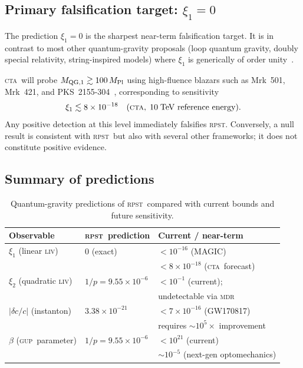 \documentclass[aps,prd,twocolumn,showpacs,preprintnumbers]{revtex4-2}
\newcommand{\rpst}{\textsc{rpst}}
\newcommand{\Mpl}{M_{\rm Pl}}
\newcommand{\CTA}{\textsc{cta}}
\newcommand{\MDR}{\textsc{mdr}}
\newcommand{\GUP}{\textsc{gup}}
\newcommand{\LIV}{\textsc{liv}}
\newcommand{\abs}[1]{\left|#1\right|}
\begin{document}
\subsection{Primary falsification target: \texorpdfstring{$\xi_1 = 0$}{xi1=0}}

The prediction $\xi_1 = 0$ is the sharpest near-term falsification target.
It is in contrast to most other quantum-gravity proposals (loop quantum
gravity, doubly special relativity, string-inspired models) where $\xi_1$ is
generically of order unity~\cite{Amelino-Camelia2000,Gambini1998}.

\CTA\ will probe $M_{\rm QG,1} \gtrsim 100\,\Mpl$ using high-fluence blazars
such as Mrk~501, Mrk~421, and PKS~2155-304~\cite{CTA2019}, corresponding to
sensitivity
\begin{equation}
  \xi_1 \lesssim 8 \times 10^{-18}
  \quad (\CTA,\;10\;\text{TeV reference energy}).
\end{equation}
Any positive detection at this level immediately falsifies \rpst.  Conversely,
a null result is consistent with \rpst\ but also with several other
frameworks; it does not constitute positive evidence.

\subsection{Summary of predictions}

\begin{table}[h]
\caption{Quantum-gravity predictions of \rpst\ compared with current bounds
and future sensitivity.}
\label{tab:predictions}
\begin{ruledtabular}
\begin{tabular}{lll}
Observable & \rpst\ prediction & Current / near-term\\
\hline
$\xi_1$ (linear \LIV)      & $0$ (exact)                 & $< 10^{-16}$ (MAGIC)~\cite{MAGIC2020}\\
                            &                             & $< 8\times10^{-18}$ (\CTA\ forecast)\\[2pt]
$\xi_2$ (quadratic \LIV)   & $1/p = 9.55\times10^{-6}$  & $< 10^{-1}$ (current); \\
                            &                             & \quad undetectable via \MDR\\[2pt]
$\abs{\delta c/c}$ (instanton) & $3.38\times10^{-21}$    & $< 7\times10^{-16}$ (GW170817)~\cite{Abbott2017}\\
                            &                             & requires $\sim 10^5\times$ improvement\\[2pt]
$\beta$ (\GUP\ parameter)  & $1/p = 9.55\times10^{-6}$  & $< 10^{21}$ (current)\\
                            &                             & $\sim 10^{-5}$ (next-gen optomechanics)\\
\end{tabular}
\end{ruledtabular}
\end{table}
\end{document}
